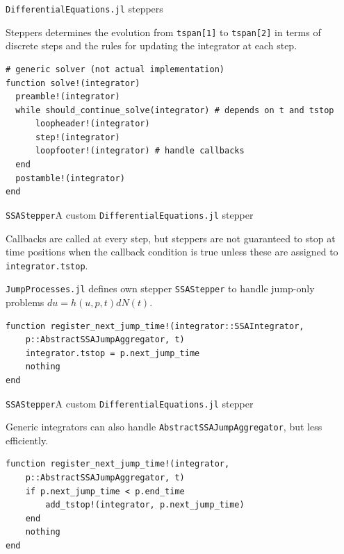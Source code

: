 \documentclass[
  ignorenonframetext,
  aspectratio=169,
  xcolor={dvipsnames,rgb}
]{beamer}
\begin{document}
\begin{frame}[fragile=singleslide]{\texttt{DifferentialEquations.jl} steppers}

Steppers determines the \alert{evolution} from \texttt{tspan[1]} to \texttt{tspan[2]} in terms of discrete steps and the rules for updating the integrator at each step.

\begin{lstlisting}
# generic solver (not actual implementation)
function solve!(integrator)
  preamble!(integrator)
  while should_continue_solve(integrator) # depends on t and tstop
      loopheader!(integrator)
      step!(integrator)
      loopfooter!(integrator) # handle callbacks
  end
  postamble!(integrator)
end
\end{lstlisting}

\end{frame}

\begin{frame}[fragile=singleslide]{\texttt{SSAStepper}}{A custom \texttt{DifferentialEquations.jl} stepper}

Callbacks are called at every step, but steppers are not guaranteed to stop at time positions when the callback condition is true \alert{unless} these are assigned to \texttt{integrator.tstop}.

\texttt{JumpProcesses.jl} defines own stepper \texttt{SSAStepper} to handle jump-only problems \( du = h (u, p, t) dN (t) \).

\begin{lstlisting}
function register_next_jump_time!(integrator::SSAIntegrator,
    p::AbstractSSAJumpAggregator, t)
    integrator.tstop = p.next_jump_time
    nothing
end
\end{lstlisting}
\end{frame}

\begin{frame}[fragile=singleslide]{\texttt{SSAStepper}}{A custom \texttt{DifferentialEquations.jl} stepper}

Generic integrators can also handle \texttt{AbstractSSAJumpAggregator}, but less efficiently.

\begin{lstlisting}
function register_next_jump_time!(integrator,
    p::AbstractSSAJumpAggregator, t)
    if p.next_jump_time < p.end_time
        add_tstop!(integrator, p.next_jump_time)
    end
    nothing
end
\end{lstlisting}

\end{frame}
\end{document}
